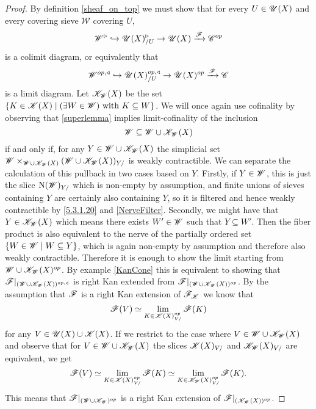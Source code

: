 \documentclass[../../thesis.tex]{subfiles}
\begin{document}
\begin{proof}
    By definition \ref{sheaf_on_top} we must show that for every $U\in \mathscr{U}(X)$ and every covering sieve $\mathscr{W}$ covering $U$,
    \[
        \mathscr{W}^{\triangleright} \hookrightarrow \mathscr{U}(X)_{/U}^{\triangleright} \rightarrow \mathscr{U}(X)\xrightarrow{\mathscr{F}}\mathscr{C}^{op}
    \]
    is a colimit diagram, or equivalently that
    \[
        \mathscr{W}^{op,\triangleleft} \hookrightarrow \mathscr{U}(X)_{/U}^{op,\triangleleft} \rightarrow \mathscr{U}(X)^{op}\xrightarrow{\mathscr{F}}\mathscr{C}
    \]
    is a limit diagram.
    Let $\mathscr{K}_{\mathscr{W}}(X)$ be the set $\{K\in \mathscr{K}(X) \mid (\exists W \in \mathscr{W}) \text{ with }K \subseteq W \}$.
    We will once again use cofinality by observing that \ref{superlemma} implies  limit-cofinality of the inclusion
    \[
        \mathscr{W} \subseteq \mathscr{W} \cup \mathscr{K}_{\mathscr{W}}(X)
    \]
    if and only if, for any $Y \in \mathscr{W} \cup \mathscr{K}_{\mathscr{W}}(X)$ the simplicial set $\mathscr{W}\times_{\mathscr{W} \cup \mathscr{K}_{\mathscr{W}}(X)}(\mathscr{W} \cup \mathscr{K}_{\mathscr{W}}(X))_{Y/}$ is weakly contractible.
    We can separate the calculation of this pullback in two cases based on $Y$.
    Firstly, if $Y\in \mathscr{W}$, this is just the slice $\mathrm{N}(\mathscr{W})_{Y/}$ which is non-empty by assumption, and finite unions of sieves containing $Y$ are certainly also containing $Y$, so it is filtered and hence weakly contractible by \ref{5.3.1.20} and \ref{NerveFilter}.
    Secondly, we might have that $Y \in \mathscr{K}_{\mathscr{W}}(X)$ which means there exists $W'\in \mathscr{W}$ such that $Y \subseteq W'$.
    Then the fiber product is also equivalent to the nerve of the partially ordered set $\{W \in \mathscr{W} \mid W \subseteq Y\}$, which is again non-empty by assumption and therefore also weakly contractible.
    Therefore it is enough to show the limit starting from $ \mathscr{W} \cup \mathscr{K}_{\mathscr{W}}(X)^{op}$.
    By example \ref{KanCone} this is equivalent to showing that $\mathscr{F}|_{(\mathscr{W} \cup \mathscr{K}_{\mathscr{W}}(X))^{op,\triangleleft}}$ is right Kan extended from $\mathscr{F}|_{(\mathscr{W} \cup \mathscr{K}_{\mathscr{W}}(X))^{op}}$.
    By the assumption that $\mathscr{F}$ is a right Kan extension of $\mathscr{F}_{\mathscr{K}}$ we know that
    \[
        \mathscr{F}(V)  \simeq \lim_{K\in \mathscr{K}(X)_{V/}^{op}} \mathscr{F}(K)
    \]
    for any $V \in \mathscr{U}(X) \cup \mathscr{K}(X)$.
    If we restrict to the case where $V \in \mathscr{W} \cup \mathscr{K}_{\mathscr{W}}(X)$ and observe that for $V\in \mathscr{W} \cup \mathscr{K}_{\mathscr{W}}(X)$ the slices $ \mathscr{K}(X)_{V/}$ and $ \mathscr{K}_{\mathscr{W}}(X)_{V/}$ are equivalent, we get
    \[
        \mathscr{F}(V) \simeq \lim_{K\in \mathscr{K}(X)_{V/}^{op}} \mathscr{F}(K) \simeq \lim_{K\in \mathscr{K}_{\mathscr{W}}(X)_{V/}^{op}} \mathscr{F}(K).
    \]
    This means that $\mathscr{F}|_{(\mathscr{W} \cup \mathscr{K}_{\mathscr{W}})^{op}}$ is a right Kan extension of $\mathscr{F}|_{(\mathscr{K}_{\mathscr{W}}(X))^{op}}$.

\end{proof}
\end{document}

